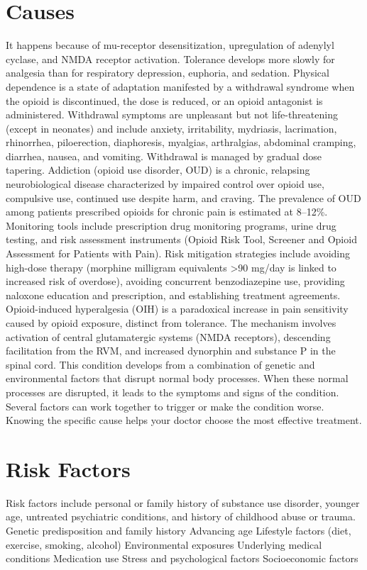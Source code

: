 \section{Causes}
It happens because of mu-receptor desensitization, upregulation of adenylyl cyclase, and NMDA receptor activation. Tolerance develops more slowly for analgesia than for respiratory depression, euphoria, and sedation. Physical dependence is a state of adaptation manifested by a withdrawal syndrome when the opioid is discontinued, the dose is reduced, or an opioid antagonist is administered. Withdrawal symptoms are unpleasant but not life-threatening (except in neonates) and include anxiety, irritability, mydriasis, lacrimation, rhinorrhea, piloerection, diaphoresis, myalgias, arthralgias, abdominal cramping, diarrhea, nausea, and vomiting. Withdrawal is managed by gradual dose tapering. Addiction (opioid use disorder, OUD) is a chronic, relapsing neurobiological disease characterized by impaired control over opioid use, compulsive use, continued use despite harm, and craving. The prevalence of OUD among patients prescribed opioids for chronic pain is estimated at 8--12\%. Monitoring tools include prescription drug monitoring programs, urine drug testing, and risk assessment instruments (Opioid Risk Tool, Screener and Opioid Assessment for Patients with Pain). Risk mitigation strategies include avoiding high-dose therapy (morphine milligram equivalents >90 mg/day is linked to increased risk of overdose), avoiding concurrent benzodiazepine use, providing naloxone education and prescription, and establishing treatment agreements. Opioid-induced hyperalgesia (OIH) is a paradoxical increase in pain sensitivity caused by opioid exposure, distinct from tolerance. The mechanism involves activation of central glutamatergic systems (NMDA receptors), descending facilitation from the RVM, and increased dynorphin and substance P in the spinal cord. This condition develops from a combination of genetic and environmental factors that disrupt normal body processes. When these normal processes are disrupted, it leads to the symptoms and signs of the condition. Several factors can work together to trigger or make the condition worse. Knowing the specific cause helps your doctor choose the most effective treatment.

\section{Risk Factors}
Risk factors include personal or family history of substance use disorder, younger age, untreated psychiatric conditions, and history of childhood abuse or trauma. Genetic predisposition and family history Advancing age Lifestyle factors (diet, exercise, smoking, alcohol) Environmental exposures Underlying medical conditions Medication use Stress and psychological factors Socioeconomic factors

